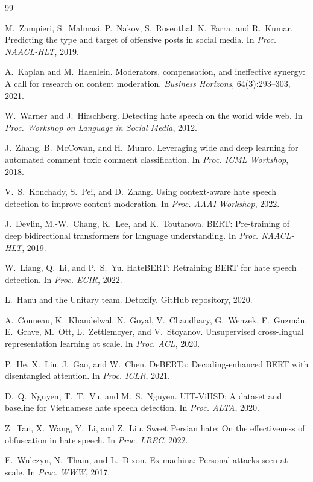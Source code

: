 \documentclass[12pt,a4paper]{article}
\begin{document}

\begin{thebibliography}{99}

M.~Zampieri, S.~Malmasi, P.~Nakov, S.~Rosenthal, N.~Farra, and R.~Kumar.
\newblock Predicting the type and target of offensive posts in social media.
\newblock In \textit{Proc. NAACL-HLT}, 2019.

A.~Kaplan and M.~Haenlein.
\newblock Moderators, compensation, and ineffective synergy: A call for research on content moderation.
\newblock \textit{Business Horizons}, 64(3):293--303, 2021.

W.~Warner and J.~Hirschberg.
\newblock Detecting hate speech on the world wide web.
\newblock In \textit{Proc. Workshop on Language in Social Media}, 2012.

J.~Zhang, B.~McCowan, and H.~Munro.
\newblock Leveraging wide and deep learning for automated comment toxic comment classification.
\newblock In \textit{Proc. ICML Workshop}, 2018.

V.~S.~Konchady, S.~Pei, and D.~Zhang.
\newblock Using context-aware hate speech detection to improve content moderation.
\newblock In \textit{Proc. AAAI Workshop}, 2022.

J.~Devlin, M.-W.~Chang, K.~Lee, and K.~Toutanova.
\newblock BERT: Pre-training of deep bidirectional transformers for language understanding.
\newblock In \textit{Proc. NAACL-HLT}, 2019.

W.~Liang, Q.~Li, and P.~S.~Yu.
\newblock HateBERT: Retraining BERT for hate speech detection.
\newblock In \textit{Proc. ECIR}, 2022.

L.~Hanu and the Unitary team.
\newblock Detoxify.
\newblock GitHub repository, 2020.

A.~Conneau, K.~Khandelwal, N.~Goyal, V.~Chaudhary, G.~Wenzek, F.~Guzm\'{a}n, E.~Grave, M.~Ott, L.~Zettlemoyer, and V.~Stoyanov.
\newblock Unsupervised cross-lingual representation learning at scale.
\newblock In \textit{Proc. ACL}, 2020.

P.~He, X.~Liu, J.~Gao, and W.~Chen.
\newblock DeBERTa: Decoding-enhanced BERT with disentangled attention.
\newblock In \textit{Proc. ICLR}, 2021.

D.~Q.~Nguyen, T.~T.~Vu, and M.~S.~Nguyen.
\newblock UIT-ViHSD: A dataset and baseline for Vietnamese hate speech detection.
\newblock In \textit{Proc. ALTA}, 2020.

Z.~Tan, X.~Wang, Y.~Li, and Z.~Liu.
\newblock Sweet Persian hate: On the effectiveness of obfuscation in hate speech.
\newblock In \textit{Proc. LREC}, 2022.

E.~Wulczyn, N.~Thain, and L.~Dixon.
\newblock Ex machina: Personal attacks seen at scale.
\newblock In \textit{Proc. WWW}, 2017.

\end{thebibliography}
\end{document}
